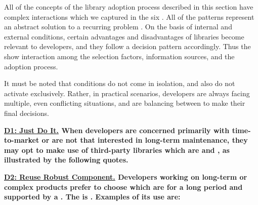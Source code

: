 All of the concepts of the library adoption process described in this section have complex interactions which we captured in the six \principle. All of the patterns represent an abstract solution to a recurring problem \cite{riehle:2021:pattern}. On the basis of internal and external conditions, certain advantages and disadvantages of libraries become relevant to developers, and they follow a decision pattern accordingly. Thus the \principle\space show interaction among the selection factors, information sources, and the adoption process. 

It must be noted that conditions do not come in isolation, and \principle\space also do not activate exclusively. Rather, in practical scenarios, developers are always facing multiple, even conflicting situations, and are balancing between \principle\space to make their final decisions.


\nd\bf{\ul{D1: Just Do It.}} When developers are concerned primarily with time-to-market or are not that interested in long-term maintenance, they may opt to make use of third-party libraries which are  and , as illustrated by the following quotes. 




\nd\bf{\ul{D2: Reuse Robust Component.}} Developers working on long-term or complex products prefer to choose  which are  for a long period and supported by a . The \principle\space is . Examples of its use are:
 

